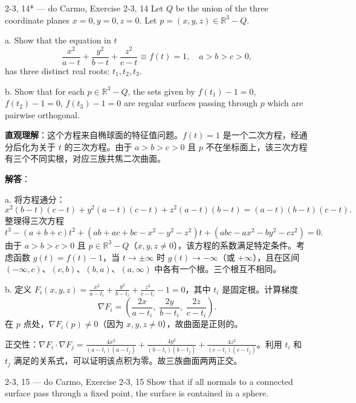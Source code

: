 \begin{exercise}{2-3, 14* — do Carmo, Exercise 2-3, 14}
Let $Q$ be the union of the three coordinate planes $x = 0, y = 0, z = 0$. Let $p = (x, y, z) \in \mathbb{R}^3 - Q$.

a. Show that the equation in $t$
\[
\frac{x^2}{a - t} + \frac{y^2}{b - t} + \frac{z^2}{c - t} \equiv f(t) = 1, \quad a > b > c > 0,
\]
has three distinct real roots: $t_1, t_2, t_3$.

b. Show that for each $p \in \mathbb{R}^3 - Q$, the sets given by $f(t_1) - 1 = 0$, $f(t_2) - 1 = 0$, $f(t_3) - 1 = 0$ are regular surfaces passing through $p$ which are pairwise orthogonal.
\end{exercise}

\begin{solution}
\textbf{直观理解}：这个方程来自椭球面的特征值问题。$f(t) = 1$ 是一个二次方程，经通分后化为关于 $t$ 的三次方程。由于 $a > b > c > 0$ 且 $p$ 不在坐标面上，该三次方程有三个不同实根，对应三族共焦二次曲面。

\textbf{解答}：

a. 将方程通分：
\[
x^2(b-t)(c-t) + y^2(a-t)(c-t) + z^2(a-t)(b-t) = (a-t)(b-t)(c-t).
\]
整理得三次方程
\[
t^3 - (a+b+c)t^2 + (ab+ac+bc - x^2 - y^2 - z^2)t + (abc - ax^2 - by^2 - cz^2) = 0.
\]
由于 $a > b > c > 0$ 且 $p \in \mathbb{R}^3 - Q$（$x,y,z \neq 0$），该方程的系数满足特定条件。考虑函数 $g(t) = f(t) - 1$，当 $t \to \pm\infty$ 时 $g(t) \to -\infty$（或 $+\infty$），且在区间 $(-\infty, c)$、$(c, b)$、$(b, a)$、$(a, \infty)$ 中各有一个根。三个根互不相同。

b. 定义 $F_i(x,y,z) = \frac{x^2}{a-t_i} + \frac{y^2}{b-t_i} + \frac{z^2}{c-t_i} - 1 = 0$，其中 $t_i$ 是固定根。计算梯度
\[
\nabla F_i = \left(\frac{2x}{a-t_i},\; \frac{2y}{b-t_i},\; \frac{2z}{c-t_i}\right).
\]
在 $p$ 点处，$\nabla F_i(p) \neq 0$（因为 $x,y,z \neq 0$），故曲面是正则的。

正交性：$\nabla F_i \cdot \nabla F_j = \frac{4x^2}{(a-t_i)(a-t_j)} + \frac{4y^2}{(b-t_i)(b-t_j)} + \frac{4z^2}{(c-t_i)(c-t_j)}$。利用 $t_i$ 和 $t_j$ 满足的关系式，可以证明该点积为零。故三族曲面两两正交。
\end{solution}

\begin{exercise}{2-3, 15 — do Carmo, Exercise 2-3, 15}
Show that if all normals to a connected surface pass through a fixed point, the surface is contained in a sphere.
\end{exercise}

